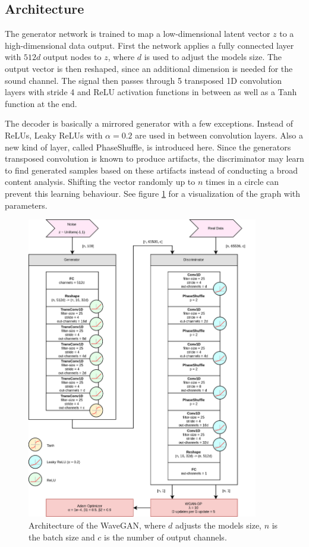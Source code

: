 \documentclass[12pt]{article}
\begin{document}
\subsection{Architecture}
The generator network is trained to map a low-dimensional latent vector $z$ to a high-dimensional data output.
First the network applies a fully connected layer with $512d$ output nodes to $z$, where $d$ is used to adjust the models size.
The output vector is then reshaped, since an additional dimension is needed for the sound channel.
The signal then passes through 5 transposed 1D convolution layers with stride 4 and ReLU activation functions in between as well as a Tanh function at the end.

The decoder is basically a mirrored generator with a few exceptions.
Instead of ReLUs, Leaky ReLUs with $\alpha=0.2$ are used in between convolution layers.
Also a new kind of layer, called PhaseShuffle, is introduced here. 
Since the generators transposed convolution is known to produce artifacts, the discriminator may learn to find generated samples based on these artifacts instead of conducting a broad content analysis.
Shifting the vector randomly up to $n$ times in a circle can prevent this learning behaviour.
See figure \ref{fig:WaveGan-arch} for a visualization of the graph with parameters.


\begin{figure}[ht!]
\includegraphics[width=0.9\textwidth]{img/wavegan-arch.png}
\caption{Architecture of the WaveGAN, where $d$ adjusts the models size, $n$ is the batch size and $c$ is the number of output channels.}%
\label{fig:WaveGan-arch}
\end{figure}
\end{document}
